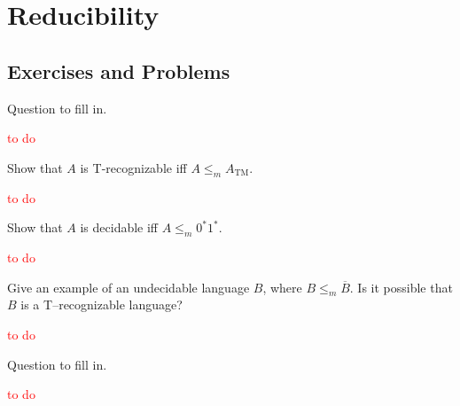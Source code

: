 \chapter{Reducibility}

\section*{Exercises and Problems}

\setcounter{exercise}{20}

\begin{exercise}{5.21}
  Question to fill in.
\end{exercise}

\textcolor{red}{to do}

\begin{exercise}{5.22}
  Show that $A$ is T-recognizable iff $A\leq_mA_{\mathrm{TM}}$.
\end{exercise}

\textcolor{red}{to do}

\begin{exercise}{5.23}
  Show that $A$ is decidable iff $A\leq_m0^*1^*$.
\end{exercise}

\textcolor{red}{to do}

\setcounter{exercise}{24}

\begin{exercise}{5.25}
  Give an example of an undecidable language $B$, where $B\leq_m \overline{B}$. Is it possible that $B$ is a T–recognizable language?
\end{exercise}

\textcolor{red}{to do}

\begin{exercise}{5.26}
  Question to fill in.
\end{exercise}

\textcolor{red}{to do}
